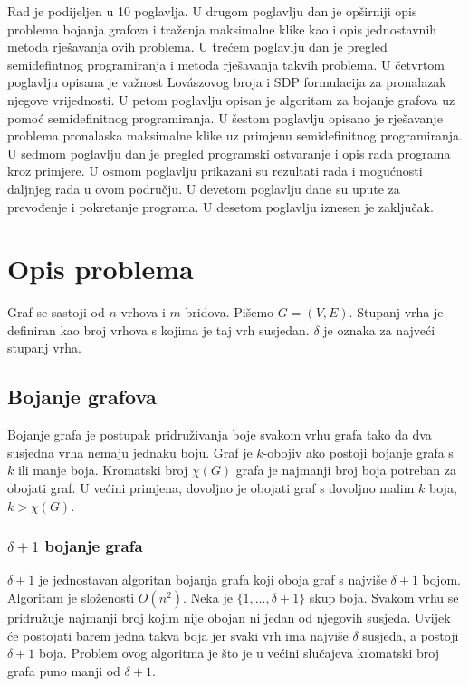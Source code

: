 \documentclass[diplomskirad]{fer}
\begin{document}
Rad je podijeljen u 10 poglavlja. U drugom poglavlju dan je opširniji opis problema bojanja grafova
i traženja maksimalne klike kao i opis jednostavnih metoda rješavanja ovih problema.
U trećem poglavlju dan je pregled semidefintnog programiranja i metoda rješavanja takvih problema.
U četvrtom poglavlju opisana je važnost Lovászovog broja i SDP formulacija za pronalazak njegove vrijednosti.
U petom poglavlju opisan je algoritam za bojanje grafova uz pomoć semidefinitnog programiranja.
U šestom poglavlju opisano je rješavanje problema pronalaska maksimalne klike uz primjenu semidefinitnog programiranja.
U sedmom poglavlju dan je pregled programski ostvaranje i opis rada programa kroz primjere.
U osmom poglavlju prikazani su rezultati rada i mogućnosti daljnjeg rada u ovom području.
U devetom poglavlju dane su upute za prevođenje i pokretanje programa.
U desetom poglavlju iznesen je zaključak.

\chapter{Opis problema}
\label{opis_problema}

Graf se sastoji od $n$ vrhova i $m$ bridova. Pišemo $G = (V, E)$. Stupanj vrha je definiran kao broj vrhova s kojima je taj vrh susjedan. $\delta$ je
oznaka za najveći stupanj vrha.

\section{Bojanje grafova}
Bojanje grafa je postupak pridruživanja boje svakom vrhu grafa tako da dva susjedna vrha nemaju jednaku boju. Graf je $k$-obojiv ako postoji
bojanje grafa s $k$ ili manje boja. Kromatski broj $\chi(G)$ grafa je najmanji broj boja potreban za obojati graf. U većini primjena,
dovoljno je obojati graf s dovoljno malim $k$ boja, $k > \chi(G)$.

\subsection{$\delta + 1$ bojanje grafa}
\label{delta1}
$\delta + 1$ je jednostavan algoritan bojanja grafa koji oboja graf s najviše $\delta + 1$ bojom. Algoritam je složenosti $O(n^2)$.
Neka je $\{1, \dots, \delta + 1\}$ skup boja. Svakom vrhu se pridružuje najmanji broj kojim nije obojan ni jedan od njegovih susjeda. Uvijek će postojati
barem jedna takva boja jer svaki vrh ima najviše $\delta$ susjeda, a postoji $\delta + 1$ boja. Problem ovog algoritma je što je u većini slučajeva 
kromatski broj grafa puno manji od $\delta + 1$.
\end{document}
